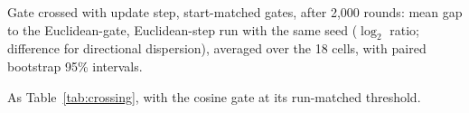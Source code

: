 \documentclass[11pt]{article}
\begin{document}
\begin{table}[h]
\centering\small
\caption{Gate crossed with update step, start-matched gates, after 2{,}000 rounds: mean gap to the Euclidean-gate, Euclidean-step run with the same seed ($\log_2$ ratio; difference for directional dispersion), averaged over the 18 cells, with paired bootstrap 95\% intervals.}
\label{tab:crossing}

\end{table}

\begin{table}[h]
\centering\small
\caption{As Table~\ref{tab:crossing}, with the cosine gate at its run-matched threshold.}
\label{tab:crossing-run}

\end{table}
\end{document}
